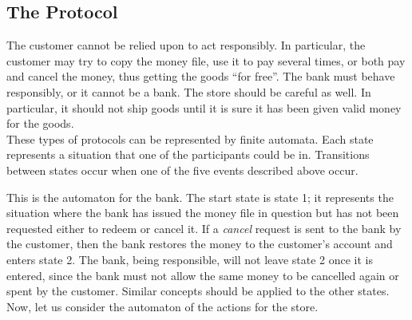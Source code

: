 \documentclass[]{article}
\begin{document}
  \subsection*{The Protocol}
    The customer cannot be relied upon to act responsibly. In particular, the
    customer may try to copy the money file, use it to pay several times, or
    both pay and cancel the money, thus getting the goods ``for free''. The
    bank must behave responsibly, or it cannot be a bank. The store should be
    careful as well. In particular, it should not ship goods until it is sure
    it has been given valid money for the goods. \\
    \indent These types of protocols can be represented by finite automata.
    Each state represents a situation that one of the participants could be
    in. Transitions between states occur when one of the five events described
    above occur. \\


    This is the automaton for the bank. The start state is state 1; it
    represents the situation where the bank has issued the money file in
    question but has not been requested either to redeem or cancel it. If a
    \emph{cancel} request is sent to the bank by the customer, then the bank
    restores the money to the customer's account and enters state 2. The bank,
    being responsible, will not leave state 2 once it is entered, since the
    bank must not allow the same money to be cancelled again or spent by the
    customer. Similar concepts should be applied to the other states. \\
    \indent Now, let us consider the automaton of the actions for the store.\\

\end{document}
